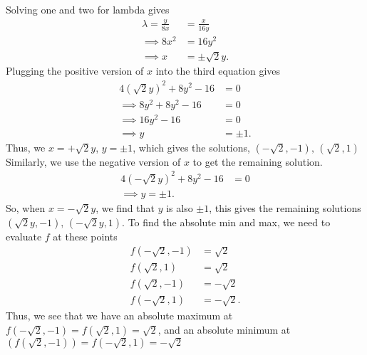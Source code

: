 \documentclass{report}
\begin{document}
            \bigbreak \noindent 
            Solving one and two for lambda gives
            \begin{align*}
                \lambda = \frac{y}{8x} &= \frac{x}{16y} \\
                \implies 8x^{2} &= 16y^{2} \\
                \implies x &= \pm\sqrt{2}y
            .\end{align*}
            Plugging the positive version of $x$ into the third equation gives 
            \begin{align*}
                4(\sqrt{2}y)^{2} +8y^{2} - 16 &= 0 \\
                \implies 8y^{2} + 8y^{2} - 16 &= 0 \\
                \implies 16y^{2} - 16 &= 0 \\
                \implies y&=\pm1
            .\end{align*}
            \bigbreak \noindent 
            Thus, we $x=+\sqrt{2}y $, $y=\pm1$, which gives the solutions, $(-\sqrt{2}, -1),\, (\sqrt{2},1) $
            \bigbreak \noindent 
            Similarly, we use the negative version of $x$ to get the remaining solution.
            \begin{align*}
                4(-\sqrt{2}y)^{2} + 8y^{2} - 16 &= 0 \\
                \implies y= \pm1
            .\end{align*}
            So, when $x=-\sqrt{2}y$, we find that $y$ is also $\pm1$, this gives the remaining solutions $(\sqrt{2}y,-1),\, (-\sqrt{2}y, 1)$. To find the absolute min and max, we need to evaluate $f$ at these points
            \begin{align*}
                f(-\sqrt{2},-1) &= \sqrt{2}\\
                f(\sqrt{2},1) &= \sqrt{2}\\
                f(\sqrt{2},-1) &= -\sqrt{2}\\
                f(-\sqrt{2},1) &= -\sqrt{2}
            .\end{align*}
            \bigbreak \noindent 
            Thus, we see that we have an absolute maximum at $f(-\sqrt{2}, -1) = f(\sqrt{2}, 1) = \sqrt{2}$, and an absolute minimum at $(f(\sqrt{2},-1)) = f(-\sqrt{2}, 1) = -\sqrt{2} $

 
\end{document}
